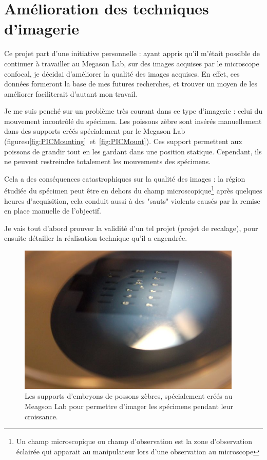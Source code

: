 \section{Amélioration des techniques d'imagerie}

Ce projet part d'une initiative personnelle : ayant appris qu'il m'était possible de continuer à travailler au Megason Lab, sur des images acquises par le microscope confocal, je décidai d'améliorer la qualité des images acquises. En effet, ces données formeront la base de mes futures recherches, et trouver un moyen de les améliorer faciliterait d'autant mon travail.

Je me suis penché sur un problème très courant dans ce type d'imagerie : 
celui du mouvement incontrôlé du spécimen.
Les poissons zèbre sont insérés manuellement dans des supports créés spécialement par le Megason Lab (figuresı\ref{fig:PICMounting}~et~\ref{fig:PICMount}). Ces support permettent aux poissons de grandir tout en les gardant dans une position statique. Cependant, ils ne peuvent restreindre totalement les mouvements des spécimens.

Cela a des conséquences catastrophiques sur la qualité des images : 
la région étudiée du spécimen peut être en dehors 
du champ microscopique\footnote{Un champ microscopique ou champ d'observation est la zone d'observation éclairée qui apparait au manipulateur lors d'une observation au microscope}
après quelques heures d'acquisition,
cela conduit aussi à des "sauts" violents causés par la remise en place manuelle de l'objectif.

Je vais tout d'abord prouver la validité d'un tel projet (projet de recalage), pour ensuite détailler la réalisation technique qu'il a engendrée.
\begin{figure}[h]
\begin{center}
\leavevmode
\includegraphics[width=0.95\textwidth]{pictures/PICmount}
\end{center}
\caption{Les supports d'embryons de possons zèbres, spécialement créés au Meagson Lab pour permettre d'imager les spécimens pendant leur croissance.}
\label{fig:PICmount}
\end{figure}

